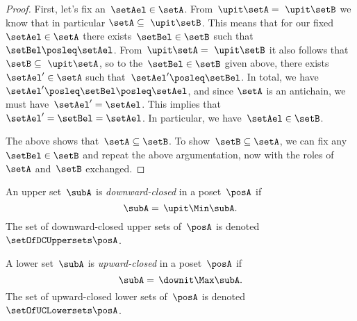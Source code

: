 \begin{proof}
    First, let's fix an~$\setAel \in \setA$.
    From~$\upit  \setA = \ \upit  \setB$ we know that in particular $\setA \subseteq \ \upit  \setB$.
    This means that for our fixed~$\setAel \in \setA$ there exists~$\setBel \in \setB$ such that~$\setBel \posleq \setAel$.
    From~$\upit \setA = \ \upit  \setB$ it also follows that~$\setB \subseteq \ \upit  \setA$, so to the~$\setBel \in \setB$ given above, there exists~$\setAel' \in \setA$ such that~$\setAel' \posleq \setBel$.
    In total, we have~$\setAel' \posleq \setBel \posleq \setAel$, and since $\setA$ is an antichain, we must have~$\setAel' = \setAel$.
    This implies that~$\setAel' = \setBel = \setAel$.
    In particular, we have~$\setAel \in \setB$.

    The above shows that~$\setA \subseteq \setB$.
    To show~$\setB \subseteq \setA$, we can fix any~$\setBel \in \setB$ and repeat the above argumentation, now with the roles of~$\setA$ and~$\setB$ exchanged.
\end{proof}

\begin{definition}
    \label{def:downward-closed-upperset}
    An upper set~$\subA$ is \emph{downward-closed} in a poset~$\posA$ if
    \begin{equation}
        \subA =\, \upit  \Min \subA.
    \end{equation}
    The set of downward-closed upper sets of~$\posA$ is denoted~$\setOfDCUppersets \posA$.

\end{definition}

\begin{definition}
    \label{def:upward-closed-lowerset}
    A lower set~$\subA$ is \emph{upward-closed} in a poset~$\posA$ if
    \begin{equation}
        \subA =\, \downit  \Max \subA.
    \end{equation}
    The set of upward-closed lower sets of~$\posA$ is denoted~$\setOfUCLowersets \posA$.
\end{definition}
